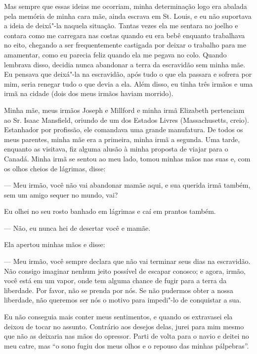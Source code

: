 Mas sempre que essas ideias me ocorriam, minha determinação logo era
abalada pela memória de minha cara mãe, ainda escrava em St. Louis, e eu
não suportava a ideia de deixá"-la naquela situação. Tantas vezes ela me
sentara no joelho e contara como me carregara nas costas quando eu era
bebê enquanto trabalhava no eito, chegando a ser frequentemente
castigada por deixar o trabalho para me amamentar, como eu parecia feliz
quando ela me pegava no colo. Quando lembrava disso, decidia nunca
abandonar a terra da escravidão sem minha mãe. Eu pensava que deixá"-la
na escravidão, após tudo o que ela passara e sofrera por mim, seria
renegar tudo o que devia a ela. Além disso, eu tinha três irmãos e uma
irmã na cidade (dois dos meus irmãos haviam morrido).

Minha mãe, meus irmãos Joseph e Millford e minha irmã Elizabeth
pertenciam ao Sr. Isaac Mansfield, oriundo de um dos Estados Livres
(Massachusetts, creio). Estanhador por profissão, ele comandava uma
grande manufatura. De todos os meus parentes, minha mãe era a primeira,
minha irmã a segunda. Uma tarde, enquanto as visitava, fiz alguma alusão
à minha proposta de viajar para o Canadá. Minha irmã se sentou ao meu
lado, tomou minhas mãos nas suas e, com os olhos cheios de lágrimas,
disse:

--- Meu irmão, você não vai abandonar mamãe aqui, e sua querida irmã
também, sem um amigo sequer no mundo, vai?

Eu olhei no seu rosto banhado em lágrimas e caí em prantos também.

--- Não, eu nunca hei de desertar você e mamãe.

Ela apertou minhas mãos e disse:

--- Meu irmão, você sempre declara que não vai terminar seus dias na
escravidão. Não consigo imaginar nenhum jeito possível de escapar
conosco; e agora, irmão, você está em um vapor, onde tem alguma chance
de fugir para a terra da liberdade. Por favor, não se prenda por nós. Se
não pudermos obter a nossa liberdade, não queremos ser nós o motivo para
impedi"-lo de conquistar a sua.

Eu não conseguia mais conter meus sentimentos, e quando os extravasei
ela deixou de tocar no assunto. Contrário aos desejos delas, jurei para
mim mesmo que não as deixaria nas mãos do opressor. Parti de volta para
o navio e deitei no meu catre, mas ``o sono fugiu dos meus olhos e o
repouso das minhas pálpebras''.

